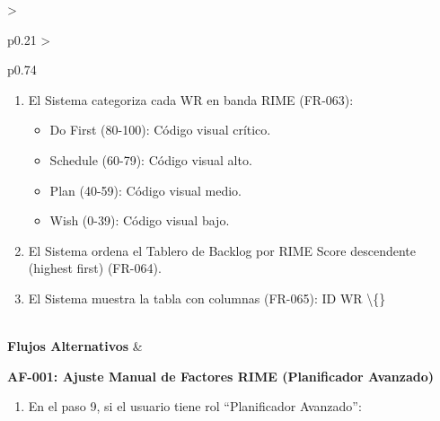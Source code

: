 \begin{longtable}{>{\raggedright\arraybackslash}p{0.21\textwidth} >{\raggedright\arraybackslash}p{0.74\textwidth}}
{\begin{enumerate}[leftmargin=1.5em, nosep, topsep=0pt]
\begin{itemize}[leftmargin=1.2em, nosep, topsep=0pt]
\item Impact (0-25):
\item Duración probable de downtime: Crítico (8+h) = 25, Mayor (4-7h) = 18, Moderado (1-3h) = 10, Menor (<1h) = 5.
\item Costo de downtime (configurable por planta).
\item Maintainability (0-25):
\item Facilidad de reparación: Simple = 25, Moderado = 15, Complejo = 8, Muy Complejo = 2.
\item Disponibilidad de repuestos: Disponible = +5, 1-7 días = +2, >7 días = -5.
\item Economy (0-25):
\item Costo estimado: Bajo (<\$1k) = 25, Medio (\$1-5k) = 15, Alto (\$5-20k) = 8, Muy Alto (>\$20k) = 2.
\item RIME Score Final = (Risk + Impact + Maintainability + Economy) / 4 (escala 0-100).
\end{itemize}
\item El Sistema categoriza cada WR en banda RIME (FR-063):
\begin{itemize}[leftmargin=1.2em, nosep, topsep=0pt]
\item Do First (80-100): Código visual crítico.
\item Schedule (60-79): Código visual alto.
\item Plan (40-59): Código visual medio.
\item Wish (0-39): Código visual bajo.
\end{itemize}
\item El Sistema ordena el Tablero de Backlog por RIME Score descendente (highest first) (FR-064).
\item El Sistema muestra la tabla con columnas (FR-065): ID WR \textbackslash\{\}
\end{enumerate} \vspace{2pt}} \\
\textbf{Flujos Alternativos} & \parbox[t]{\linewidth}{\vspace{2pt} \vspace{4pt}\noindent\textbf{AF-001: Ajuste Manual de Factores RIME (Planificador Avanzado)}
\newline
\begin{enumerate}[leftmargin=1.5em, nosep, topsep=0pt]
\item En el paso 9, si el usuario tiene rol ``Planificador Avanzado'':
\begin{itemize}[leftmargin=1.2em, nosep, topsep=0pt]

\end{itemize}
\end{enumerate}}
\end{longtable}
